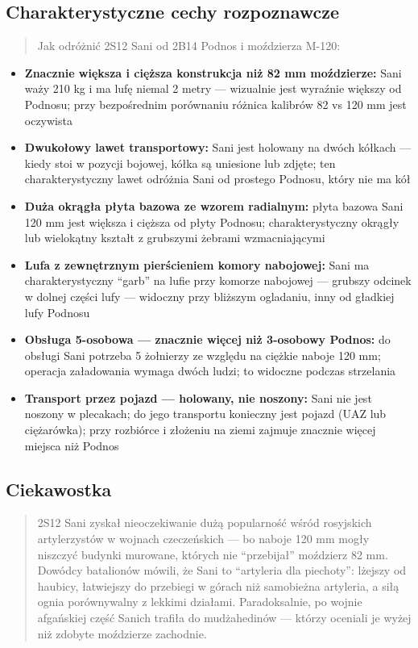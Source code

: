 \documentclass[12pt,oneside]{book}
\providecommand{\tightlist}{%
  \setlength{\itemsep}{0pt}\setlength{\parskip}{0pt}}
\begin{document}
\subsection{Charakterystyczne cechy
rozpoznawcze}\label{charakterystyczne-cechy-rozpoznawcze-36}

\begin{quote}
Jak odróżnić 2S12 Sani od 2B14 Podnos i moździerza M-120:
\end{quote}

\begin{itemize}
\tightlist
\item
  \textbf{Znacznie większa i cięższa konstrukcja niż 82 mm moździerze:}
  Sani waży 210 kg i ma lufę niemal 2 metry --- wizualnie jest wyraźnie
  większy od Podnosu; przy bezpośrednim porównaniu różnica kalibrów 82
  vs 120 mm jest oczywista
\item
  \textbf{Dwukołowy lawet transportowy:} Sani jest holowany na dwóch
  kółkach --- kiedy stoi w pozycji bojowej, kółka są uniesione lub
  zdjęte; ten charakterystyczny lawet odróżnia Sani od prostego Podnosu,
  który nie ma kół
\item
  \textbf{Duża okrągła płyta bazowa ze wzorem radialnym:} płyta bazowa
  Sani 120 mm jest większa i cięższa od płyty Podnosu; charakterystyczny
  okrągły lub wielokątny kształt z grubszymi żebrami wzmacniającymi
\item
  \textbf{Lufa z zewnętrznym pierścieniem komory nabojowej:} Sani ma
  charakterystyczny ``garb'' na lufie przy komorze nabojowej --- grubszy
  odcinek w dolnej części lufy --- widoczny przy bliższym ogladaniu,
  inny od gładkiej lufy Podnosu
\item
  \textbf{Obsługa 5-osobowa --- znacznie więcej niż 3-osobowy Podnos:}
  do obsługi Sani potrzeba 5 żołnierzy ze względu na ciężkie naboje 120
  mm; operacja załadowania wymaga dwóch ludzi; to widoczne podczas
  strzelania
\item
  \textbf{Transport przez pojazd --- holowany, nie noszony:} Sani nie
  jest noszony w plecakach; do jego transportu konieczny jest pojazd
  (UAZ lub ciężarówka); przy rozbiórce i złożeniu na ziemi zajmuje
  znacznie więcej miejsca niż Podnos
\end{itemize}

\subsection{Ciekawostka}\label{ciekawostka-36}

\begin{quote}
2S12 Sani zyskał nieoczekiwanie dużą popularność wśród rosyjskich
artylerzystów w wojnach czeczeńskich --- bo naboje 120 mm mogły niszczyć
budynki murowane, których nie ``przebijał'' moździerz 82 mm. Dowódcy
batalionów mówili, że Sani to ``artyleria dla piechoty'': lżejszy od
haubicy, łatwiejszy do przebiegi w górach niż samobieżna artyleria, a
siłą ognia porównywalny z lekkimi działami. Paradoksalnie, po wojnie
afgańskiej część Sanich trafiła do mudżahedinów --- którzy oceniali je
wyżej niż zdobyte moździerze zachodnie.
\end{quote}
\end{document}
